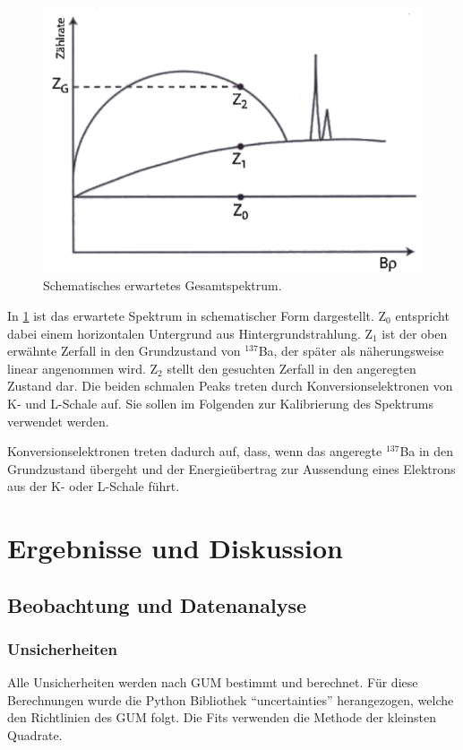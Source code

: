 \documentclass[
	a4paper,
	12pt,
	pagesize,
	ngerman
]{scrartcl}
\begin{document}
	\begin{figure}[H]
			\includegraphics[width= 0.6 \linewidth]{img/Schema_Spektrum}
			\caption{
			Schematisches erwartetes Gesamtspektrum.
			\cite{Anleitung}
			}
			\label{fig_Schema_Spektrum}
	\end{figure}

	In \cref{fig_Schema_Spektrum} ist das erwartete Spektrum in schematischer Form dargestellt.
	Z$_0$ entspricht dabei einem horizontalen Untergrund aus Hintergrundstrahlung.
	Z$_1$ ist der oben erwähnte Zerfall in den Grundzustand von $^{137}$Ba, der später als näherungsweise linear angenommen wird.
	Z$_2$ stellt den gesuchten Zerfall in den angeregten Zustand dar.
	Die beiden schmalen Peaks treten durch Konversionselektronen von K- und L-Schale auf.
	Sie sollen im Folgenden zur Kalibrierung des Spektrums verwendet werden.

	Konversionselektronen treten dadurch auf, dass, wenn das angeregte $^{137}$Ba in den Grundzustand übergeht und der Energieübertrag zur Aussendung eines Elektrons aus der K- oder L-Schale führt.

	\section{Ergebnisse und Diskussion}


	\subsection{Beobachtung und Datenanalyse}
	\subsubsection{Unsicherheiten}
	Alle Unsicherheiten werden nach GUM bestimmt und berechnet.
	Für diese Berechnungen wurde die Python Bibliothek \enquote{uncertainties} herangezogen, welche den Richtlinien des GUM folgt.
	Die Fits verwenden die Methode der kleinsten Quadrate.
\end{document}
